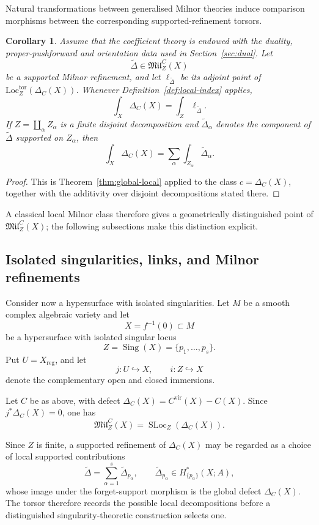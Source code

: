 \documentclass[10pt,a4paper,dvipsnames,x11names]{amsart}
\newcommand{\Loc}{\mathrm{Loc}}
\newcommand{\SLoc}{\operatorname{SLoc}}
\numberwithin{equation}{section}
\theoremstyle{plain}
\newtheorem{corollary}[corollary]{Corollary}
\theoremstyle{definition}
\theoremstyle{remark}
\begin{document}
Natural transformations between generalised Milnor theories induce comparison morphisms between the corresponding supported-refinement torsors.

\begin{corollary}\label{cor:milnor-local-index}
Assume that the coefficient theory is endowed with the duality, proper-pushforward and orientation data used in Section~\ref{sec:dual}.  Let
\[
\widetilde\Delta\in \mathfrak{Mil}^C_Z(X)
\]
be a supported Milnor refinement, and let $\ell_{\widetilde\Delta}$ be its adjoint point of $\Loc_Z^{\mathrm{tor}}(\Delta_C(X))$.  Whenever Definition~\ref{def:local-index} applies,
\[
\int_X \Delta_C(X)=\int_Z \ell_{\widetilde\Delta}.
\]
If $Z=\coprod_\alpha Z_\alpha$ is a finite disjoint decomposition and $\widetilde\Delta_\alpha$ denotes the component of $\widetilde\Delta$ supported on $Z_\alpha$, then
\[
\int_X \Delta_C(X)
=
\sum_\alpha \int_{Z_\alpha}\widetilde\Delta_\alpha.
\]
\end{corollary}

\begin{proof}
This is Theorem~\ref{thm:global-local} applied to the class $c=\Delta_C(X)$, together with the additivity over disjoint decompositions stated there.
\end{proof}


A classical local Milnor class therefore gives a geometrically distinguished point of $\mathfrak{Mil}^C_Z(X)$; the following subsections make this distinction explicit.



\subsection{Isolated singularities, links, and Milnor refinements}
\label{subsec:isolated-singularities-milnor-refinements}

Consider now a hypersurface with isolated singularities.  Let $M$ be a smooth complex algebraic variety and let
\[
X=f^{-1}(0)\subset M
\]
be a hypersurface with isolated singular locus
\[
Z=\operatorname{Sing}(X)=\{p_1,\ldots,p_s\}.
\]
Put $U=X_{\mathrm{reg}}$, and let
\[
j:U\hookrightarrow X,
\qquad
 i:Z\hookrightarrow X
\]
denote the complementary open and closed immersions.

Let $C$ be as above, with defect $\Delta_C(X)=C^{\mathrm{vir}}(X)-C(X)$.  Since $j^*\Delta_C(X)=0$, one has
\[
\mathfrak{Mil}^C_Z(X)=\SLoc_Z(\Delta_C(X)).
\]

Since $Z$ is finite, a supported refinement of $\Delta_C(X)$ may be regarded as
a choice of local supported contributions
\[
\widetilde{\Delta}
=
\sum_{\alpha=1}^s \widetilde{\Delta}_{p_\alpha},
\qquad
\widetilde{\Delta}_{p_\alpha}\in H^*_{\{p_\alpha\}}(X;A),
\]
whose image under the forget-support morphism is the global defect $\Delta_C(X)$.  The torsor therefore records the possible local decompositions before a distinguished singularity-theoretic construction selects one.
\end{document}
